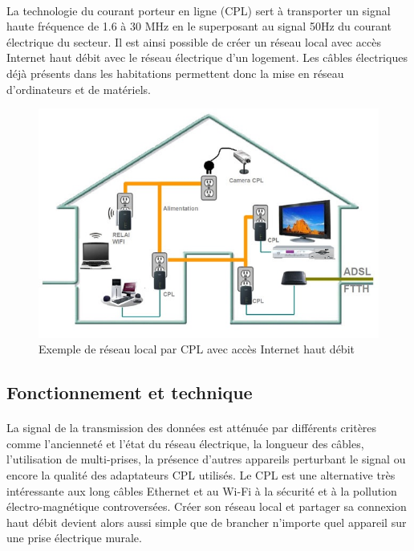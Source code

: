             \paragraph{}
La technologie du courant porteur en ligne (CPL) sert à transporter un signal haute fréquence de 1.6 à 30 MHz en le superposant au signal 50Hz du courant électrique du secteur.
Il est ainsi possible de créer un réseau local avec accès Internet haut débit avec le réseau électrique d'un logement.
Les câbles électriques déjà présents dans les habitations permettent donc la mise en réseau d'ordinateurs et de matériels.
    \begin{figure}
        \begin{center}
            \includegraphics[scale=0.5]{./images/cpl/exempleReseauLocalCPL.jpg}
        \end{center}
            \caption{ Exemple de réseau local par CPL avec accès Internet haut débit } %
            \label{Exemple liens actuels avec CPL}
    \end{figure}

        \subsection{Fonctionnement et technique}
            \paragraph{}
La signal de la transmission des données est atténuée par différents critères comme l’ancienneté et l'état du réseau électrique, la longueur des câbles, l'utilisation de multi-prises, la présence d'autres appareils perturbant le signal ou encore la qualité des adaptateurs CPL utilisés.
Le CPL est une alternative très intéressante aux long câbles Ethernet et au Wi-Fi à la sécurité et à la pollution électro-magnétique controversées.
Créer son réseau local et partager sa connexion haut débit devient alors aussi simple que de brancher n'importe quel appareil sur une prise électrique murale.

